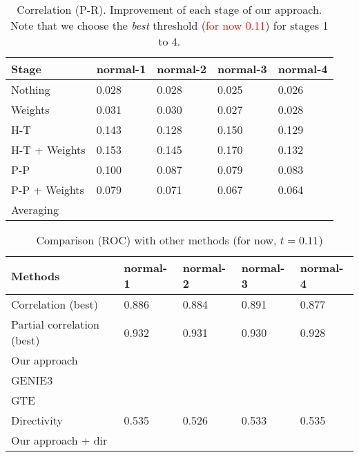 \documentclass[wcp]{jmlr}
\begin{document}
\begin{table}[H]
\centering
\caption{Correlation (P-R). Improvement of each stage of our approach. Note that we choose the
         \textit{best} threshold (\textcolor{red}{for now 0.11}) for stages 1 to 4.}
\begin{tabular}{*{5}{l}}
\toprule
Stage               & normal-1 & normal-2 & normal-3 & normal-4 \\
\midrule
Nothing             & 0.028 & 0.028 & 0.025 & 0.026\\
Weights             & 0.031 & 0.030 & 0.027 & 0.028\\
H-T                 & 0.143 & 0.128 & 0.150 & 0.129\\
H-T + Weights       & 0.153 & 0.145 & 0.170 & 0.132\\
P-P                 & 0.100 & 0.087 & 0.079 & 0.083\\
P-P + Weights       & 0.079 & 0.071 & 0.067 & 0.064\\
Averaging           & & & & \\
\bottomrule
\end{tabular}
\end{table}


\begin{table}[H]
\centering
\caption{Comparison (ROC) with other methods (for now, $t = 0.11$)}
\begin{tabular}{*{5}{l}}
\toprule
Methods             & normal-1 & normal-2 & normal-3 & normal-4 \\
\midrule
Correlation (best)         & 0.886 & 0.884 & 0.891 & 0.877\\
Partial correlation (best) & 0.932 & 0.931 & 0.930 & 0.928 \\
Our approach               & & & & \\
GENIE3                     & & & & \\
GTE                        & & & & \\
Directivity                & 0.535 & 0.526 & 0.533 & 0.535 \\
Our approach + dir         & & & & \\
\bottomrule
\end{tabular}
\end{table}
\end{document}
